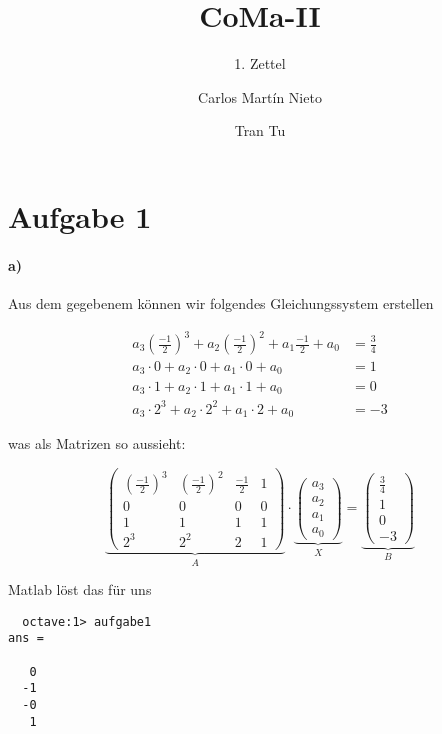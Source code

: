 \documentclass[a4paper,ngerman]{scrartcl}
\begin{document}
\title{CoMa-II}
\subtitle{1. Zettel}
\author{Carlos Martín Nieto \and Tran Tu}
\maketitle

\section*{Aufgabe 1}
\paragraph{a)}
Aus dem gegebenem können wir folgendes Gleichungssystem erstellen

\begin{align*}
  a_3 \left(\frac{-1}{2}\right)^3 + a_2\left(\frac{-1}{2}\right)^2 + a_1\frac{-1}{2} + a_0 &= \frac{3}{4}\\
  a_3 \cdot 0 + a_2 \cdot 0 + a_1 \cdot 0 + a_0 &= 1\\
  a_3 \cdot 1 + a_2 \cdot 1 + a_1 \cdot 1 + a_0 &= 0\\
  a_3 \cdot 2^3+ a_2 \cdot 2^2+ a_1 \cdot 2+ a_0 &= -3
\end{align*}

was als Matrizen so aussieht:

\[
\underbrace{\begin{pmatrix}
  \left(\frac{-1}{2}\right)^3 & \left(\frac{-1}{2}\right)^2 & \frac{-1}{2} & 1\\
  0 & 0 & 0 & 0\\
  1 & 1 & 1 & 1\\
  2^3 & 2^2 & 2 & 1
\end{pmatrix}}_{A}\cdot
\underbrace{\begin{pmatrix}
  a_3\\ a_2\\ a_1\\ a_0
\end{pmatrix}}_{X} =
\underbrace{\begin{pmatrix}
  \frac{3}{4} \\ 1 \\ 0 \\ -3
\end{pmatrix}}_{B}
\]

Matlab löst das für uns

\begin{lstlisting}
  octave:1> aufgabe1
ans =

   0
  -1
  -0
   1
\end{lstlisting}
\end{document}
